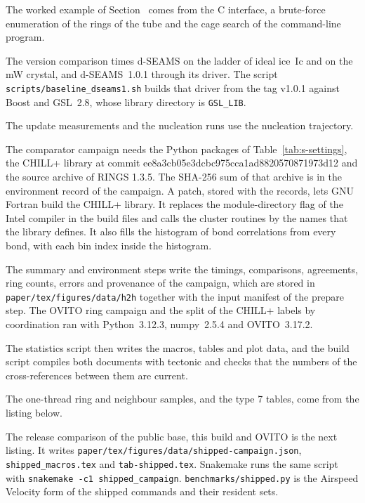 \documentclass[preprint,12pt]{elsarticle}
\begin{document}
The worked example of Section~ comes from the C interface, a brute-force enumeration of the rings of the tube and the cage search of the command-line program.

The version comparison times d-SEAMS on the ladder of ideal ice~Ic and on the mW crystal, and d-SEAMS~1.0.1 through its driver.
The script \texttt{scripts/baseline\_dseams1.sh} builds that driver from the tag v1.0.1 against Boost and GSL~2.8, whose library directory is \texttt{GSL\_LIB}.

The update measurements and the nucleation runs use the nucleation trajectory.

The comparator campaign needs the Python packages of Table~\ref{tab:s-settings}, the CHILL+ library at commit ee8a3cb05e3dcbc975cca1ad8820570871973d12 and the source archive of RINGS 1.3.5.
The SHA-256 sum of that archive is in the environment record of the campaign.
A patch, stored with the records, lets GNU Fortran build the CHILL+ library.
It replaces the module-directory flag of the Intel compiler in the build files and calls the cluster routines by the names that the library defines.
It also fills the histogram of bond correlations from every bond, with each bin index inside the histogram.

The summary and environment steps write the timings, comparisons, agreements, ring counts, errors and provenance of the campaign, which are stored in \texttt{paper/tex/figures/data/h2h} together with the input manifest of the prepare step.
The OVITO ring campaign and the split of the CHILL+ labels by coordination ran with Python~3.12.3, numpy~2.5.4 and OVITO~3.17.2.

The statistics script then writes the macros, tables and plot data, and the build script compiles both documents with tectonic and checks that the numbers of the cross-references between them are current.

The one-thread ring and neighbour samples, and the type 7 tables, come from the listing below.

The release comparison of the public base, this build and OVITO is the next listing.
It writes \texttt{paper/tex/figures/data/shipped-campaign.json}, \texttt{shipped\_macros.tex} and \texttt{tab-shipped.tex}.
Snakemake runs the same script with \texttt{snakemake -c1 shipped\_campaign}.
\texttt{benchmarks/shipped.py} is the Airspeed Velocity form of the shipped commands and their resident sets.

 
\end{document}
